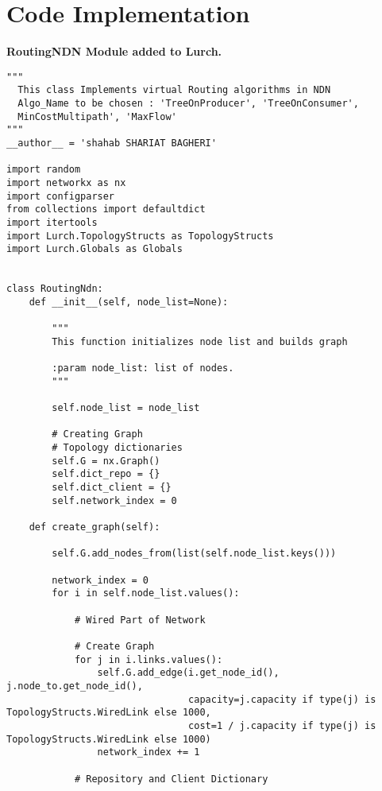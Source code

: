 
\chapter{Code Implementation} %

\label{Appendix} %

\textbf{RoutingNDN Module added to Lurch.}

\begin{lstlisting}
"""
  This class Implements virtual Routing algorithms in NDN
  Algo_Name to be chosen : 'TreeOnProducer', 'TreeOnConsumer',
  MinCostMultipath', 'MaxFlow'
"""
__author__ = 'shahab SHARIAT BAGHERI'

import random
import networkx as nx
import configparser
from collections import defaultdict
import itertools
import Lurch.TopologyStructs as TopologyStructs
import Lurch.Globals as Globals


class RoutingNdn:
    def __init__(self, node_list=None):

        """
        This function initializes node list and builds graph

        :param node_list: list of nodes.
        """

        self.node_list = node_list

        # Creating Graph
        # Topology dictionaries
        self.G = nx.Graph()
        self.dict_repo = {}
        self.dict_client = {}
        self.network_index = 0

    def create_graph(self):

        self.G.add_nodes_from(list(self.node_list.keys()))

        network_index = 0
        for i in self.node_list.values():

            # Wired Part of Network

            # Create Graph
            for j in i.links.values():
                self.G.add_edge(i.get_node_id(), j.node_to.get_node_id(),
                                capacity=j.capacity if type(j) is TopologyStructs.WiredLink else 1000,
                                cost=1 / j.capacity if type(j) is TopologyStructs.WiredLink else 1000)
                network_index += 1

            # Repository and Client Dictionary


\end{lstlisting}
